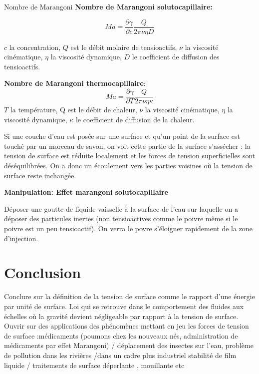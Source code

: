 \documentclass[french, a4paper, 10pt, twocolumn, landscape]{article}
\begin{document}
\begin{definition}{Nombre de Marangoni}
  \textbf{Nombre de Marangoni solutocapillaire:}\medskip

  \begin{equation} 
    Ma = \dfrac{\partial \gamma}{\partial c} \dfrac{Q}{2\pi\nu\eta D} 
  \end{equation}

  $c$ la concentration, $Q$ est le d{\'e}bit molaire de tensioactifs, $\nu$ la
  viscosit{\'e} cin{\'e}matique, $\eta$ la viscosit{\'e} dynamique, $D$ le
  coefficient de diffusion des tensioactifs.\medskip

  \textbf{Nombre de Marangoni thermocapillaire}:
  \begin{equation} 
    Ma = \dfrac{\partial \gamma}{\partial T} \dfrac{Q}{2 \pi \nu \eta\kappa} 
    \end{equation}
  $T$ la temp{\'e}rature, Q est le d{\'e}bit de chaleur, $\nu$ la
  viscosit{\'e} cin{\'e}matique, $\eta$ la viscosit{\'e} dynamique, $\kappa$
  le coefficient de diffusion de la chaleur.
\end{definition}

Si une couche d'eau est pos{\'e}e sur une surface et qu'un point de la
surface est touch{\'e} par un morceau de savon, on voit cette partie de la
surface s'ass{\'e}cher : la tension de surface est r{\'e}duite localement et
les forces de tension superficielles sont d{\'e}s{\'e}quilibr{\'e}es. On a
donc un {\'e}coulement vers les parties voisines o{\`u} la tension de surface
reste inchang{\'e}e.


\begin{definition}
  \textbf{Manipulation: Effet marangoni solutocapillaire}\medskip
  
  D{\'e}poser une goutte de liquide vaisselle {\`a} la surface de l'eau sur
  laquelle on a d{\'e}poser des particules inertes (non tensioactives comme le
  poivre m{\^e}me si le poivre est un peu tensioactif). On verra le povre
  s'{\'e}loigner rapidement de la zone d'injection.
\end{definition}

\section*{Conclusion}

Conclure sur la d{\'e}finition de la tension de surface comme le rapport d'une
{\'e}nergie par unit{\'e} de surface. Loi qui se retrouve dans le comportement
des fluides aux {\'e}chelles o{\`u} la gravit{\'e} devient n{\'e}gligeable par
rapport {\`a} la tension de surface. Ouvrir sur des applications des
ph{\'e}nom{\`e}nes mettant en jeu les forces de tension de surface
:m{\'e}dicaments (poumons chez les nouveaux n{\'e}s, administration de
m{\'e}dicaments par effet Marangoni) / d{\'e}placement des insectes sur l'eau,
probl{\`e}me de pollution dans les rivi{\`e}res /dans un cadre plus industriel
stabilit{\'e} de film liquide / traitements de surface d{\'e}perlante ,
mouillante etc
\end{document}
